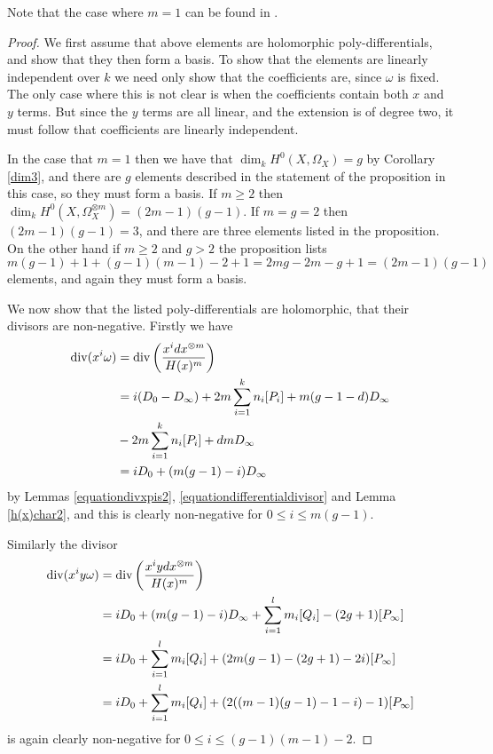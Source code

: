     \begin{rem}
    Note that the case where $m=1$ can be found in \cite[Prop. 7.4.26]{liu}.
    \end{rem}

    \begin{proof}
    We first assume that above elements are holomorphic poly-differentials, and show that they then form a basis.
    To show that the elements are linearly independent over $k$ we need only show that the coefficients are, since $\omega$ is fixed.
    The only case where this is not clear is when the coefficients contain both $x$ and $y$ terms.
    But since the $y$ terms are all linear, and the extension is of degree two, it must follow that coefficients are linearly independent.
    
    
    In the case that $m=1$ then we have that $\dim_k H^0(X,\Omega_X) =g$ by Corollary \ref{dim3}, and there are $g$ elements described in the statement of the proposition in this case, so they must form a basis.
    If $m \geq 2$ then $\dim_k H^0(X,\Omega_X^{\otimes m}) = (2m-1)(g-1)$.
    If $m=g=2$ then $(2m-1)(g-1) = 3$, and there are three elements listed in the proposition.
    On the other hand if $m\geq 2$ and $g > 2$ the proposition lists
        \[
        m(g-1)+1 + (g-1)(m-1)-2+1 = 2mg -2m -g +1 = (2m-1)(g-1)
        \]
    elements, and again they must form a basis.
    
    We now show that the listed poly-differentials are holomorphic, \ie that their divisors are non-negative.
    Firstly we have
        \begin{align*}
        \operatorname{div}(x^i\omega) & =  \operatorname{div} \left( \frac{x^i dx^{\otimes m}}{H(x)^m} \right)\\ 
        & =  i(D_0 - D_\infty) +2m\sum_{i=1}^k n_i[P_i] + m(g-1-d)D_\infty\\
        &  -2m\sum_{i=1}^k n_i [P_i] + dmD_\infty \\
        & =  iD_0 + (m(g-1) -i)D_\infty
        \end{align*}
    by Lemmas \eqref{equationdivxpis2}, \ref{equationdifferentialdivisor} and Lemma \ref{h(x)char2}, and this is clearly non-negative for $0\leq i \leq m(g-1)$.
    
    Similarly the divisor 
        \begin{align*}
        \operatorname{div}(x^iy\omega) & =  \operatorname{div} \left( \frac{x^i ydx^{\otimes m}}{H(x)^m} \right)\\ 
        & =  iD_0 + (m(g-1) -i)D_\infty + \sum_{i=1}^l m_i[Q_i] - (2g+1)[P_\infty] \\
        & =  iD_0 +  \sum_{i=1}^l m_i[Q_i] + (2m(g-1) -(2g+1) -2i)[P_\infty] \\
        & =  iD_0 +  \sum_{i=1}^l m_i[Q_i] + (2((m-1)(g-1) -1 -i)-1)[P_\infty]
        \end{align*}
    is again clearly non-negative for $0 \leq i \leq (g-1)(m-1)-2$.
    
    \end{proof}



